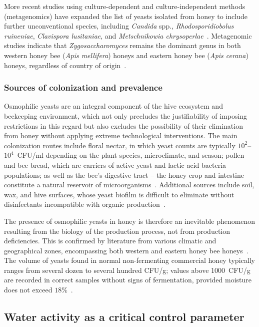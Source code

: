 More recent studies using culture-dependent and culture-independent
methods (metagenomics) have expanded the list of yeasts isolated
from honey to include further unconventional species, including
\textit{Candida} spp., \textit{Rhodosporidiobolus ruineniae},
\textit{Clavispora lusitaniae}, and \textit{Metschnikowia
chrysoperlae}~\cite{rodriguezmachado2024}.
Metagenomic studies indicate that \textit{Zygosaccharomyces}
remains the dominant genus in both western honey bee
(\textit{Apis mellifera}) honeys and eastern honey bee
(\textit{Apis cerana}) honeys, regardless of country of
origin~\cite{yeastbiodiversity2025}.

\subsubsection{Sources of colonization and prevalence}
Osmophilic yeasts are an integral component of the hive ecosystem
and beekeeping environment, which not only precludes the
justifiability of imposing restrictions in this regard but also
excludes the possibility of their elimination from honey without
applying extreme technological interventions. The main colonization
routes include floral nectar, in which yeast counts are typically
$10^2$--$10^4$~CFU/ml depending on the plant species, microclimate,
and season; pollen and bee bread, which are carriers of active
yeast and lactic acid bacteria populations; as well as the bee's
digestive tract -- the honey crop and intestine constitute a natural
reservoir of microorganisms~\cite{alwaili2012}.
Additional sources include soil, wax, and hive surfaces, whose yeast
biofilm is difficult to eliminate without disinfectants incompatible
with organic production~\cite{alwaili2012}.

The presence of osmophilic yeasts in honey is therefore an inevitable
phenomenon resulting from the biology of the production process,
not from production deficiencies. This is confirmed by literature
from various climatic and geographical zones, encompassing both
western and eastern honey bee
honeys~\cite{yeastbiodiversity2025}.
The volume of yeasts found in normal non-fermenting commercial
honey typically ranges from several dozen to several hundred CFU/g;
values above 1000~CFU/g are recorded in correct samples without
signs of fermentation, provided moisture does not exceed
$18\%$~\cite{analytica2020}.


\subsection{Water activity as a critical control parameter}


